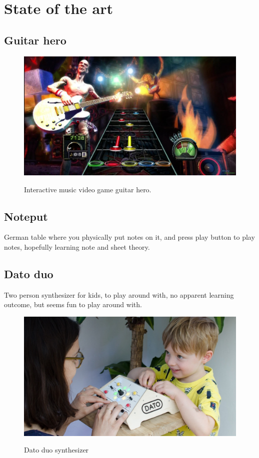 \section{State of the art}\label{sec:sota}
	\subsection{Guitar hero}\label{sec:guitarHero}
		\begin{figure}[H]
			\centering
			\includegraphics[width=0.7\linewidth]{figure/Analysis/guitarhero}
			\label{fig:guitarHero}
			\caption{Interactive music video game guitar hero.}
		\end{figure}
	\subsection{Noteput}
		German table where you physically put notes on it, and press play button to play notes, hopefully learning note and sheet theory.
	\subsection{Dato duo}
		Two person synthesizer for kids, to play around with, no apparent learning outcome, but seems fun to play around with.
		\begin{figure}[H]
			\centering
			\includegraphics[width=0.7\linewidth]{figure/Analysis/datoduo}
			\label{fig:datoduo}
			\caption{Dato duo synthesizer}
		\end{figure}
